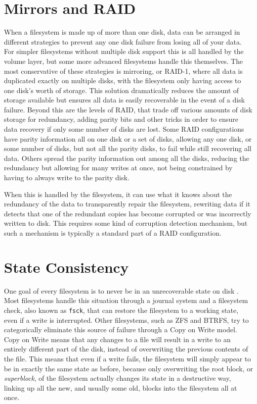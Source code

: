 \section{Mirrors and RAID}
When a filesystem is made up of more than one disk, data can be arranged in different strategies to prevent any one disk
failure from losing all of your data.
For simpler filesystems without multiple disk support this is all handled by the volume layer,
but some more advanced filesystems handle this themselves.
The most conservative of these strategies is mirroring, or RAID-1, where all data is duplicated exactly on multiple disks,
with the filesystem only having access to one disk's worth of storage\cite{patterson_case_1988}.
This solution dramatically reduces the amount of storage available but ensures all data is easily recoverable in
the event of a disk failure.
Beyond this are the levels of RAID, that trade off various amounts of disk storage for redundancy, adding parity bits and other
tricks in order to ensure data recovery if only some number of disks are lost.
Some RAID configurations have parity information all on one disk or a set of disks, 
allowing any one disk, or some number of disks, but not all the parity disks, to fail while still recovering all data.
Others spread the parity information out among all the disks, reducing the redundancy but allowing for many writes at once,
not being constrained by having to always write to the parity disk.

When this is handled by the filesystem, it can use what it knows about the redundancy of the data to transparently repair
the filesystem, rewriting data if it detects that one of the redundant copies has become corrupted or was incorrectly
written to disk.
This requires some kind of corruption detection mechanism, but such a mechanism is typically a standard part of a RAID configuration.

\section{State Consistency}
One goal of every filesystem is to never be in an unrecoverable state on disk
\cite{ahrens_openzfs_basics,mckusick_zfs_2015_presentation}.
Most filesystems handle this situation through a journal system and a filesystem check, also known as \texttt{fsck},
that can restore the filesystem to a working state, even if a write is interrupted.
Other filesystems, such as ZFS and BTRFS, try to categorically eliminate this source of failure through a Copy on Write
model.
Copy on Write means that any changes to a file will result in a write to an entirely different part of the disk, instead of 
overwriting the previous contents of the file.
This means that even if a write fails, the filesystem will simply appear to be in exactly the same state as before, because
only overwriting the root block, or \textit{superblock}, of the filesystem actually changes its state in a destructive way, 
linking up all the new, and usually some old, blocks into the filesystem all at once.

